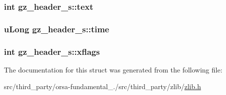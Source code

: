 \subsubsection[{text}]{\setlength{\rightskip}{0pt plus 5cm}int gz\+\_\+header\+\_\+s\+::text}\label{structgz__header__s_af94c3fadfed835a501bc1babc4b894f9}
\hypertarget{structgz__header__s_a5f00bb6f9689c1abf7a54dad449ce9d3}{}
\subsubsection[{time}]{\setlength{\rightskip}{0pt plus 5cm}u\+Long gz\+\_\+header\+\_\+s\+::time}\label{structgz__header__s_a5f00bb6f9689c1abf7a54dad449ce9d3}
\hypertarget{structgz__header__s_a40e35dc1a967c6537c6012cf5416210a}{}
\subsubsection[{xflags}]{\setlength{\rightskip}{0pt plus 5cm}int gz\+\_\+header\+\_\+s\+::xflags}\label{structgz__header__s_a40e35dc1a967c6537c6012cf5416210a}


The documentation for this struct was generated from the following file\+:\begin{DoxyCompactItemize}
\item 
src/third\+\_\+party/orsa-\/fundamental\+\_./src/third\+\_\+party/zlib/\hyperlink{zlib_8h}{zlib.\+h}\end{DoxyCompactItemize}
